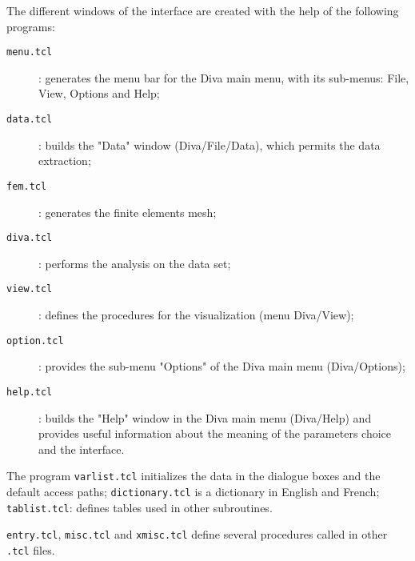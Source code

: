 The different windows of the interface are created with the help of the following programs:
\begin{description}
\item [\texttt{menu.tcl}]: generates the menu bar for the Diva main menu, with its sub-menus: File, View, Options and Help;
\item[\texttt{data.tcl}]: builds the "Data" window (Diva/File/Data), which permits the data extraction;
\item[\texttt{fem.tcl}]: generates the finite elements mesh;
\item[\texttt{diva.tcl}]: performs the analysis on the data set; 
\vspace{.25cm}
\item[\texttt{view.tcl}]: defines the procedures for the visualization (menu Diva/View);
\item[\texttt{option.tcl}]: provides the sub-menu "Options" of the Diva main menu (Diva/Options);
\item[\texttt{help.tcl}]: builds the "Help" window in the Diva main menu (Diva/Help) and provides useful information about the meaning of the parameters choice and the interface.
\end{description}


The program \texttt{varlist.tcl} initializes the data in the dialogue boxes and the default access paths; \texttt{dictionary.tcl} is a dictionary in English and French; \texttt{tablist.tcl}: defines tables used in other subroutines.

\texttt{entry.tcl}, \texttt{misc.tcl} and \texttt{xmisc.tcl} define several procedures called in other \texttt{.tcl} files.


